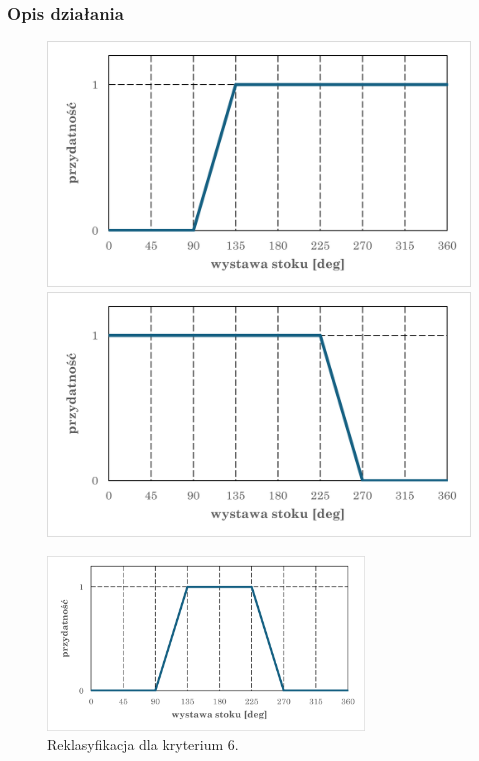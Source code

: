 \documentclass{article}
\begin{document}
\subsubsection{Opis działania}
\begin{figure}[H]
    \centering
    \begin{minipage}{0.48\textwidth}
        \centering
        \includegraphics[width=\linewidth]{img/kryterium6-wykres-pierwszy.png}
        \caption*{}
    \end{minipage}
    \begin{minipage}{0.48\textwidth}
        \centering
        \includegraphics[width=\linewidth]{img/kryterium6-wykres-drugi.png}
        \caption*{}
    \end{minipage}
\end{figure}

\begin{figure}[H]
    \centering
    \includegraphics[width=0.75\textwidth]{img/kryterium6-wykres-glowny.png}
    \caption*{Reklasyfikacja dla kryterium 6.}
\end{figure}
\end{document}
